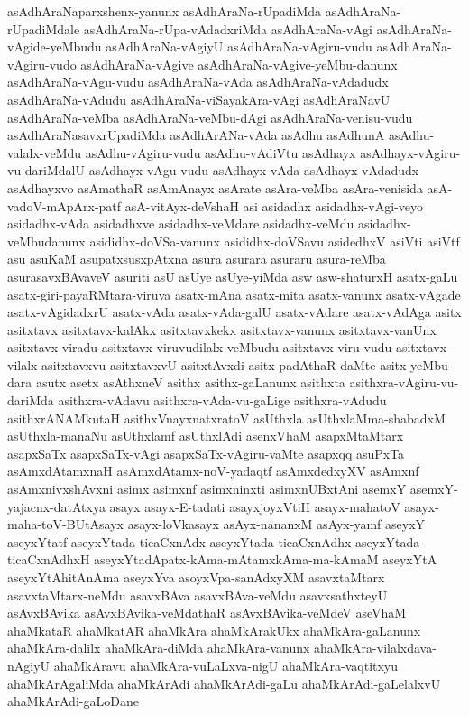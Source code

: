 {asAdhAraNaparxshenx-yanunx
asAdhAraNa-rUpadiMda
asAdhAraNa-rUpadiMdale
asAdhAraNa-rUpa-vAdadxriMda
asAdhAraNa-vAgi
asAdhAraNa-vAgide-yeMbudu
asAdhAraNa-vAgiyU
asAdhAraNa-vAgiru-vudu
asAdhAraNa-vAgiru-vudo
asAdhAraNa-vAgive
asAdhAraNa-vAgive-yeMbu-danunx
asAdhAraNa-vAgu-vudu
asAdhAraNa-vAda
asAdhAraNa-vAdadudx
asAdhAraNa-vAdudu
asAdhAraNa-viSayakAra-vAgi
asAdhAraNavU
asAdhAraNa-veMba
asAdhAraNa-veMbu-dAgi
asAdhAraNa-venisu-vudu
asAdhAraNasavxrUpadiMda
asAdhArANa-vAda
asAdhu
asAdhunA
asAdhu-valalx-veMdu
asAdhu-vAgiru-vudu
asAdhu-vAdiVtu
asAdhayx
asAdhayx-vAgiru-vu-dariMdalU
asAdhayx-vAgu-vudu
asAdhayx-vAda
asAdhayx-vAdadudx
asAdhayxvo
asAmathaR
asAmAnayx
asArate
asAra-veMba
asAra-venisida
asA-vadoV-mApArx-patf
asA-vitAyx-deVshaH
asi
asidadhx
asidadhx-vAgi-veyo
asidadhx-vAda
asidadhxve
asidadhx-veMdare
asidadhx-veMdu
asidadhx-veMbudanunx
asididhx-doVSa-vanunx
asididhx-doVSavu
asidedhxV
asiVti
asiVtf
asu
asuKaM
asupatxsusxpAtxna
asura
asurara
asuraru
asura-reMba
asurasavxBAvaveV
asuriti
asU
asUye
asUye-yiMda
asw
asw-shaturxH
asatx-gaLu
asatx-giri-payaRMtara-viruva
asatx-mAna
asatx-mita
asatx-vanunx
asatx-vAgade
asatx-vAgidadxrU
asatx-vAda
asatx-vAda-galU
asatx-vAdare
asatx-vAdAga
asitx
asitxtavx
asitxtavx-kalAkx
asitxtavxkekx
asitxtavx-vanunx
asitxtavx-vanUnx
asitxtavx-viradu
asitxtavx-viruvudilalx-veMbudu
asitxtavx-viru-vudu
asitxtavx-vilalx
asitxtavxvu
asitxtavxvU
asitxtAvxdi
asitx-padAthaR-daMte
asitx-yeMbu-dara
asutx
asetx
asAthxneV
asithx
asithx-gaLanunx
asithxta
asithxra-vAgiru-vu-dariMda
asithxra-vAdavu
asithxra-vAda-vu-gaLige
asithxra-vAdudu
asithxrANAMkutaH
asithxVnayxnatxratoV
asUthxla
asUthxlaMma-shabadxM
asUthxla-manaNu
asUthxlamf
asUthxlAdi
asenxVhaM
asapxMtaMtarx
asapxSaTx
asapxSaTx-vAgi
asapxSaTx-vAgiru-vaMte
asapxqq
asuPxTa
asAmxdAtamxnaH
asAmxdAtamx-noV-yadaqtf
asAmxdedxyXV
asAmxnf
asAmxnivxshAvxni
asimx
asimxnf
asimxninxti
asimxnUBxtAni
asemxY
asemxY-yajacnx-datAtxya
asayx
asayx-E-tadati
asayxjoyxVtiH
asayx-mahatoV
asayx-maha-toV-BUtAsayx
asayx-loVkasayx
asAyx-nananxM
asAyx-yamf
aseyxY
aseyxYtatf
aseyxYtada-ticaCxnAdx
aseyxYtada-ticaCxnAdhx
aseyxYtada-ticaCxnAdhxH
aseyxYtadApatx-kAma-mAtamxkAma-ma-kAmaM
aseyxYtA
aseyxYtAhitAnAma
aseyxYva
asoyxVpa-sanAdxyXM
asavxtaMtarx
asavxtaMtarx-neMdu
asavxBAva
asavxBAva-veMdu
asavxsathxteyU
asAvxBAvika
asAvxBAvika-veMdathaR
asAvxBAvika-veMdeV
aseVhaM
ahaMkataR
ahaMkatAR
ahaMkAra
ahaMkArakUkx
ahaMkAra-gaLanunx
ahaMkAra-dalilx
ahaMkAra-diMda
ahaMkAra-vanunx
ahaMkAra-vilalxdava-nAgiyU
ahaMkAravu
ahaMkAra-vuLaLxva-nigU
ahaMkAra-vaqtitxyu
ahaMkArAgaliMda
ahaMkArAdi
ahaMkArAdi-gaLu
ahaMkArAdi-gaLelalxvU
ahaMkArAdi-gaLoDane
}
